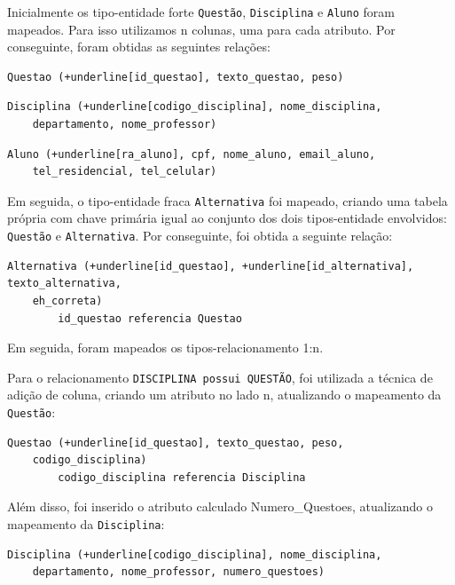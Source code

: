 \documentclass[12pt,a4paper]{article}
\begin{document}
Inicialmente os tipo-entidade forte \texttt{Questão}, \texttt{Disciplina} e \texttt{Aluno} foram mapeados. Para isso utilizamos n colunas, uma para cada atributo. Por conseguinte, foram obtidas as seguintes relações:

\begin{Verbatim}[commandchars=+\[\]]
    Questao (+underline[id_questao], texto_questao, peso)
\end{Verbatim}
\begin{Verbatim}[commandchars=+\[\]]
    Disciplina (+underline[codigo_disciplina], nome_disciplina,
    departamento, nome_professor)
\end{Verbatim}
\begin{Verbatim}[commandchars=+\[\]]
    Aluno (+underline[ra_aluno], cpf, nome_aluno, email_aluno,
    tel_residencial, tel_celular)
\end{Verbatim}

Em seguida, o tipo-entidade fraca \texttt{Alternativa} foi mapeado, criando uma tabela própria com chave primária igual ao conjunto dos dois tipos-entidade envolvidos: \texttt{Questão} e \texttt{Alternativa}. Por conseguinte, foi obtida a seguinte relação:

\begin{Verbatim}[commandchars=+\[\]]
    Alternativa (+underline[id_questao], +underline[id_alternativa], texto_alternativa, 
    eh_correta)
        id_questao referencia Questao
\end{Verbatim}

Em seguida, foram mapeados os tipos-relacionamento 1:n.

Para o relacionamento \texttt{DISCIPLINA possui QUESTÃO}, foi utilizada a técnica de adição de coluna, criando um atributo no lado n, atualizando o mapeamento da \texttt{Questão}:

\begin{Verbatim}[commandchars=+\[\]]
    Questao (+underline[id_questao], texto_questao, peso,
    codigo_disciplina)
        codigo_disciplina referencia Disciplina
\end{Verbatim}

Além disso, foi inserido o atributo calculado Numero\_Questoes, atualizando o mapeamento da \texttt{Disciplina}:

\begin{Verbatim}[commandchars=+\[\]]
    Disciplina (+underline[codigo_disciplina], nome_disciplina,
    departamento, nome_professor, numero_questoes)
\end{Verbatim}
\end{document}
